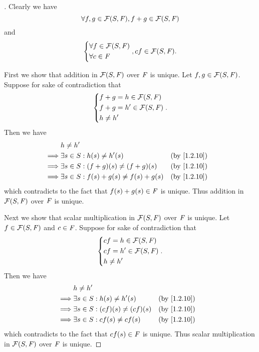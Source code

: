\begin{proof}[]
  Clearly we have
  \[
    \forall f, g \in \mathcal{F}(S, \mathit{F}), f + g \in \mathcal{F}(S, \mathit{F})
  \]
  and
  \[
    \begin{dcases}
      \forall f \in \mathcal{F}(S, \mathit{F}) \\
      \forall c \in \mathit{F}
    \end{dcases}, cf \in \mathcal{F}(S, \mathit{F}).
  \]

  First we show that addition in \(\mathcal{F}(S, \mathit{F})\) over \(\mathit{F}\) is unique.
  Let \(f, g \in \mathcal{F}(S, \mathit{F})\).
  Suppose for sake of contradiction that
  \[
    \begin{dcases}
      f + g = h \in \mathcal{F}(S, \mathit{F})  \\
      f + g = h' \in \mathcal{F}(S, \mathit{F}) \\
      h \neq h'
    \end{dcases}.
  \]
  Then we have
  \begin{align*}
             & h \neq h'                                                       \\
    \implies & \exists s \in S : h(s) \neq h'(s)              &  & \by{1.2.10} \\
    \implies & \exists s \in S : (f + g)(s) \neq (f + g)(s)   &  & \by{1.2.10} \\
    \implies & \exists s \in S : f(s) + g(s) \neq f(s) + g(s) &  & \by{1.2.10}
  \end{align*}
  which contradicts to the fact that \(f(s) + g(s) \in \mathit{F}\) is unique.
  Thus addition in \(\mathcal{F}(S, \mathit{F})\) over \(\mathit{F}\) is unique.

  Next we show that scalar multiplication in \(\mathcal{F}(S, \mathit{F})\) over \(\mathit{F}\) is unique.
  Let \(f \in \mathcal{F}(S, \mathit{F})\) and \(c \in \mathit{F}\).
  Suppose for sake of contradiction that
  \[
    \begin{dcases}
      cf = h \in \mathcal{F}(S, \mathit{F})  \\
      cf = h' \in \mathcal{F}(S, \mathit{F}) \\
      h \neq h'
    \end{dcases}.
  \]
  Then we have
  \begin{align*}
             & h \neq h'                                               \\
    \implies & \exists s \in S : h(s) \neq h'(s)      &  & \by{1.2.10} \\
    \implies & \exists s \in S : (cf)(s) \neq (cf)(s) &  & \by{1.2.10} \\
    \implies & \exists s \in S : cf(s) \neq cf(s)     &  & \by{1.2.10}
  \end{align*}
  which contradicts to the fact that \(cf(s) \in \mathit{F}\) is unique.
  Thus scalar multiplication in \(\mathcal{F}(S, \mathit{F})\) over \(\mathit{F}\) is unique.


\end{proof}
